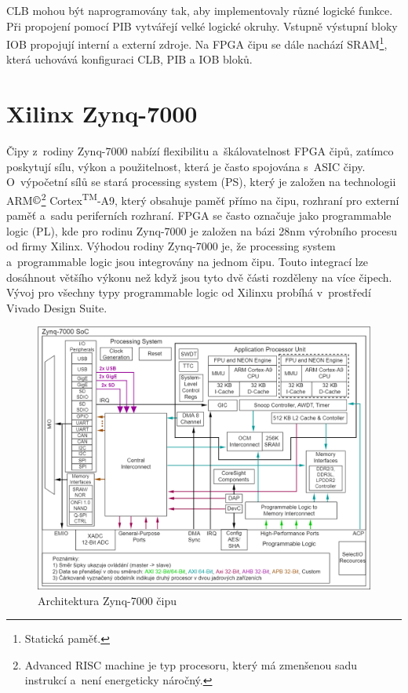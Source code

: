 CLB mohou být naprogramovány tak, aby implementovaly různé logické funkce. Při propojení pomocí PIB vytvářejí velké logické okruhy. Vstupně výstupní bloky IOB propojují interní a externí zdroje. Na FPGA čipu se dále nachází SRAM\footnote{Statická paměť.\label{foot:sram}}, která uchovává konfiguraci CLB, PIB a IOB bloků.\cite{Sekanina3540403779ISBN}

\setcounter{footnote}{0}
\section{Xilinx Zynq-7000}
Čipy z~rodiny Zynq-7000 nabízí flexibilitu a~škálovatelnost FPGA čipů, zatímco poskytují sílu, výkon a použitelnost, která je často spojována s~ASIC čipy.
O~výpočetní sílů se stará processing system (PS), který je založen na technologii ARM$\copyright$\footnote{Advanced RISC machine je typ procesoru, který má zmenšenou sadu instrukcí a~není energeticky náročný.\label{foot:ARM}} Cortex\textsuperscript{TM}-A9, který obsahuje paměť přímo na čipu, rozhraní pro externí paměť a~sadu periferních rozhraní. FPGA se často označuje jako programmable logic (PL), kde pro rodinu Zynq-7000 je založen na bázi 28nm výrobního procesu od firmy Xilinx. Výhodou rodiny Zynq-7000 je, že processing system a~programmable logic jsou integrovány na jednom čipu. Touto integrací lze dosáhnout většího výkonu než když jsou tyto dvě části rozděleny na více čipech. Vývoj pro všechny typy programmable logic od Xilinxu probíhá v~prostředí Vivado Design Suite.\cite{Zynq-7000}
\begin{figure}[!h]
  \begin{center}
    \includegraphics[scale=0.4]{obrazky/Zynq-7000-own.png}
  \end{center}
  \caption[Architektura Zynq-7000]{Architektura Zynq-7000 čipu \cite{Zynq-7000}}
  \label{img:Zynq-7000}
\end{figure}
